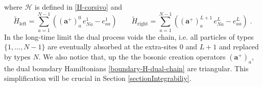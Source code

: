 \documentclass[10pt]{article}
\numberwithin{equation}{section}
\numberwithin{equation}{subsection}
\newcommand{\dt}{\;.}
\begin{document}
where $\mathcal{H}$ is defined in \eqref{H-corsivo} and 
\begin{equation}\label{boundary-H-dual-chain}
	\widetilde{H}_{\text{left}}=\sum_{a=1}^{N-1}\left((\mathbf{a}^{+})_{a}^{0}\,e_{Na}^{1}-e_{aa}^{1}\right)\qquad 	\widetilde{H}_{\text{right}}=\sum_{a=1}^{N-1}\left((\mathbf{a}^{+})_{a}^{L+1}\,e_{Na}^{L}-e_{aa}^{L}\right)\dt
\end{equation}
In the long-time limit the dual process voids the chain, i.e. all particles of types $\{1,\ldots,N-1\}$ are eventually absorbed at the extra-sites $0$ and $L+1$ and replaced by types $N$. We also notice that, up the the bosonic creation operators $(\mathbf{a}^{+})_{a}$, the dual boundary Hamiltonians \eqref{boundary-H-dual-chain} are triangular. This simplification will be crucial in Section \ref{sectionIntegrabiliy}.\\
\end{document}
